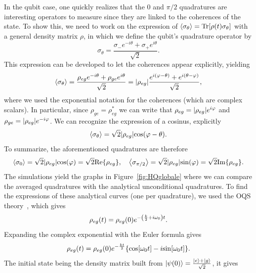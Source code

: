 In the qubit case, one quickly realizes that the $0$ and $\pi/2$ quadratures are interesting operators to measure since they are linked to the coherences of the state. To show this, we need to work on the expression of $\expval{\sigma_\theta} = \mathrm{Tr}\qty[\rho(t)\sigma_\theta]$ with a general density matrix $\rho$, in which we define the qubit's quadrature operator by  
\begin{equation}
    \sigma_\theta = \frac{\sigma_- e^{-i\theta} + \sigma_+ e^{i\theta}}{\sqrt{2}}.
\end{equation}
This expression can be developed to let the coherences appear explicitly, yielding
\begin{equation}
    \expval{\sigma_\theta} = \frac{\rho_{eg} e^{-i\theta} + \rho_{ge} e^{i\theta}}{\sqrt{2}} = \abs{\rho_{eg}}\frac{e^{i(\varphi-\theta)}+e^{i(\theta-\varphi)}}{\sqrt{2}},
\end{equation}
where we used the exponential notation for the coherences (which are complex scalars). In particular, since $\rho_{ge}=\rho_{eg}^*$ we can write that $\rho_{eg}=\abs{\rho_{eg}}e^{i\varphi}$ and $\rho_{ge}=\abs{\rho_{eg}}e^{-i\varphi}$. We can recognize the expression of a cosinus, explicitly
\begin{equation}
    \expval{\sigma_\theta} = \sqrt{2} \abs{\rho_{eg}} \mathrm{cos}\qty(\varphi-\theta).
\end{equation}
To summarize, the aforementioned quadratures are therefore
\begin{equation}
    \expval{\sigma_0} = \sqrt{2} \abs{\rho_{eg}} \mathrm{cos}\qty(\varphi)=\sqrt{2}\mathrm{Re}\qty{\rho_{eg}}, \quad \expval{\sigma_{\pi/2}} = \sqrt{2} \abs{\rho_{eg}} \mathrm{sin}\qty(\varphi)=\sqrt{2}\mathrm{Im}\qty{\rho_{eg}}.
\end{equation}
The simulations yield the graphs in Figure~\ref{fig:HQglobale} where we can compare the averaged quadratures with the analytical unconditional quadratures. To find the expressions of these analytical curves (one per quadrature), we used the OQS theory~\cite{Breuer}, which gives
\begin{equation}
    \rho_{eg}(t) = \rho_{eg}(0)e^{-\qty(\frac{k}{2}+i\omega_0) t}.
\end{equation}
Expanding the complex exponential with the Euler formula gives
\begin{equation}
    \rho_{eg}(t) = \rho_{eg}(0)e^{-\frac{k t}{2}}\qty{\mathrm{cos}\qty[\omega_0  t]-i\mathrm{sin}\qty[\omega_0  t]}.
\end{equation}
The initial state being the density matrix built from $\ket{\psi(0)}=\frac{\ket{e}+\ket{g}}{\sqrt{2}}$, it gives
